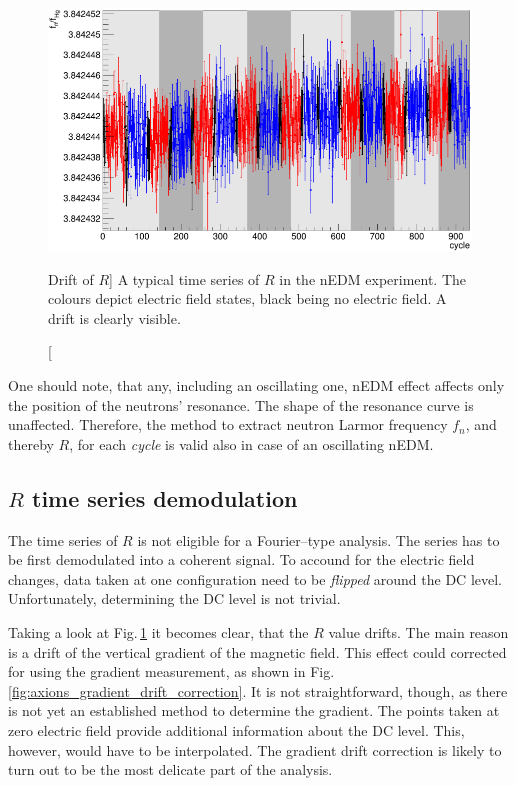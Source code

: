 \begin{figure}[bth]
  \myfloatalign
  \includegraphics[width=.8\linewidth]{gfx/axions/gradient_drift_yoann}
  \caption
  [Drift of $R$]
  {%
A typical time series of $R$ in the nEDM experiment. The colours depict electric field states, black being no electric field. A drift is clearly visible.}
  \label{fig:axions_gradient_drift}
\end{figure}

One should note, that any, including an oscillating one, nEDM effect affects only the position of the neutrons' resonance. The shape of the resonance curve is unaffected. Therefore, the method to extract neutron Larmor frequency $f_n$, and thereby $R$, for each \emph{cycle} is valid also in case of an oscillating nEDM.


\subsection{$R$ time series demodulation}
The time series of $R$ is not eligible for a Fourier--type analysis. The series has to be first demodulated into a coherent signal. To accound for the electric field changes, data taken at one configuration need to be \emph{flipped} around the DC level. Unfortunately, determining the DC level is not trivial.

Taking a look at Fig.\,\ref{fig:axions_gradient_drift} it becomes clear, that the $R$ value drifts. The main reason is a drift of the vertical gradient of the magnetic field. This effect could corrected for using the gradient measurement, as shown in Fig.\,\ref{fig:axions_gradient_drift_correction}. It is not straightforward, though, as there is not yet an established method to determine the gradient. The points taken at zero electric field provide additional information about the DC level. This, however, would have to be interpolated. The gradient drift correction is likely to turn out to be the most delicate part of the analysis.

